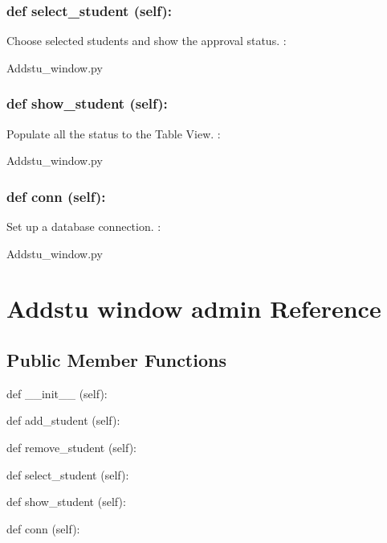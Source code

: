\hypertarget{class_poly_a14a7ad77ce612b0c54f531d307ee4b39}{
\subsubsection[{def select_student(self):}]{\setlength{\rightskip}{0pt plus 5cm}def {select\_student} (self):}}\label{class_poly_a14a7ad77ce612b0c54f531d307ee4b39}
Choose selected students and show the approval status. 
:\begin{DoxyCompactItemize}
\item 
Addstu\_window.\-py\end{DoxyCompactItemize}

\hypertarget{class_poly_a14a7ad77ce612b0c54f531d307ee4b39}{
\subsubsection[{def show_student(self):}]{\setlength{\rightskip}{0pt plus 5cm}def {show\_student} (self):}}\label{class_poly_a14a7ad77ce612b0c54f531d307ee4b39}
Populate all the status to the Table View.
:\begin{DoxyCompactItemize}
\item 
Addstu\_window.\-py\end{DoxyCompactItemize}

\hypertarget{class_poly_a14a7ad77ce612b0c54f531d307ee4b39}{
\subsubsection[{def conn(self):}]{\setlength{\rightskip}{0pt plus 5cm}def {conn} (self):}}\label{class_poly_a14a7ad77ce612b0c54f531d307ee4b39}
Set up a database connection.
:\begin{DoxyCompactItemize}
\item 
Addstu\_window.\-py\end{DoxyCompactItemize}



\hypertarget{Addstu_window_admin}{\section{Addstu window admin Reference}
\label{Addstu_window_admin}
}
\subsection*{Public Member Functions}
\begin{DoxyCompactItemize}
\item 
def {\_\_init\_\_} (self):
\item 
def {add\_student} (self):
\item 
def {remove\_student} (self):
\item 
def {select\_student} (self):
\item 
def {show\_student} (self):
\item 
def {conn} (self):

\end{DoxyCompactItemize}

